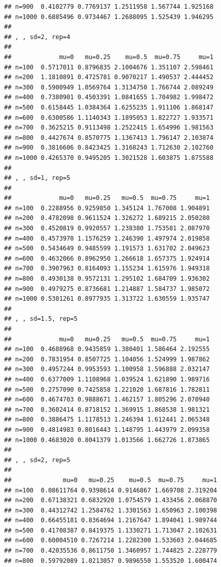 \documentclass[11pt,a4paper]{article}
\begin{document}
\begin{verbatim}
## n=900  0.4102779 0.7769137 1.2511958 1.567744 1.925168
## n=1000 0.6885496 0.9734467 1.2688095 1.525439 1.946295
## 
## , , sd=2, rep=4
## 
##             mu=0   mu=0.25    mu=0.5  mu=0.75     mu=1
## n=100  0.5717011 0.8796835 2.1004676 1.351107 2.598461
## n=200  1.1810891 0.4725781 0.9070217 1.490537 2.444452
## n=300  0.5900949 1.0569764 1.3134750 1.766744 2.089249
## n=400  0.7380901 0.4503391 1.0841655 1.704982 1.998472
## n=500  0.6158445 1.0384364 1.6255235 1.911106 1.868147
## n=600  0.6300586 1.1140343 1.1895053 1.822727 1.933571
## n=700  0.3625215 0.9113498 1.2522415 1.654996 1.981563
## n=800  0.4427674 0.8570775 1.1367413 1.796147 2.103874
## n=900  0.3816606 0.8423425 1.3168243 1.712630 2.102760
## n=1000 0.4265370 0.9495205 1.3021528 1.603875 1.875588
## 
## , , sd=1, rep=5
## 
##             mu=0   mu=0.25   mu=0.5  mu=0.75     mu=1
## n=100  0.2288956 0.9259850 1.345124 1.767008 1.904891
## n=200  0.4782098 0.9611524 1.326272 1.689215 2.050280
## n=300  0.4520819 0.9920557 1.238380 1.753581 2.087970
## n=400  0.4573970 1.1576259 1.246390 1.497974 2.019858
## n=500  0.5434649 0.9485599 1.191573 1.631702 2.049623
## n=600  0.4632066 0.8962950 1.266618 1.657375 1.924914
## n=700  0.3907963 0.8164093 1.155234 1.615976 1.949318
## n=800  0.4930138 0.9572131 1.295102 1.684709 1.936302
## n=900  0.4979275 0.8736681 1.214887 1.584737 1.985072
## n=1000 0.5301261 0.8977935 1.313722 1.630559 1.935747
## 
## , , sd=1.5, rep=5
## 
##             mu=0   mu=0.25   mu=0.5  mu=0.75     mu=1
## n=100  0.4688968 0.9435859 1.380401 1.586464 2.192555
## n=200  0.7831954 0.8507725 1.104056 1.524999 1.987862
## n=300  0.4957244 0.9953593 1.100958 1.596888 2.032147
## n=400  0.6377009 1.1108968 1.039524 1.621890 1.989716
## n=500  0.2757090 0.7425858 1.221020 1.687816 1.782811
## n=600  0.4674703 0.9888671 1.462157 1.805296 2.070940
## n=700  0.3602414 0.8718152 1.369915 1.868538 1.981321
## n=800  0.3886475 1.1178513 1.246394 1.612441 2.065348
## n=900  0.4814983 0.8016443 1.148795 1.443979 2.099358
## n=1000 0.4683020 0.8041379 1.013566 1.662726 1.873865
## 
## , , sd=2, rep=5
## 
##              mu=0   mu=0.25    mu=0.5  mu=0.75     mu=1
## n=100  0.08611764 0.9398614 0.9146867 1.669708 2.319204
## n=200  0.67138321 0.6832920 1.0754579 1.433456 2.068870
## n=300  0.44312742 1.2584762 1.3301563 1.650963 2.100398
## n=400  0.66455181 0.8364694 1.2167647 1.894041 1.989744
## n=500  0.41708387 0.8419375 1.1330271 1.713047 2.102631
## n=600  0.60004510 0.7267214 1.2282300 1.533603 2.044685
## n=700  0.42035536 0.8611750 1.3460957 1.744825 2.228779
## n=800  0.59792089 1.0213057 0.9896550 1.553520 1.600474

\end{verbatim}
\end{document}
